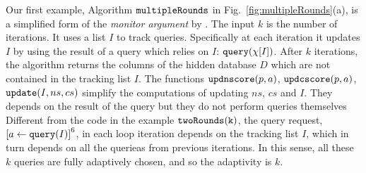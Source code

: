 %
Our first example, Algorithm $\mathtt{multipleRounds}$ in Fig.~\ref{fig:multipleRounds}(a), is a simplified form of the \emph{monitor argument} by \citet{RogersRSSTW20}.
The input $k$ is the number of iterations.
It uses a list $I$ to track queries. Specifically at each iteration it updates $I$ by using the result of a query which relies on $I$:  ${\tt query}(\chi[I])$.
After $k$ iterations, the algorithm returns the columns of the hidden database $D$ which are not contained in the  tracking list $I$.
The functions $\mathtt{updnscore}(p,a)$,
$\mathtt{updcscore}(p,a)$, $\mathtt{update}(I,ns,cs)$ simplify the computations of updating $ns$, $cs$ and $I$. They depends on the result of the query but they do not perform queries themselves%
%
%
Different from the code in the example $\mathtt{twoRounds(k)}$,
the query request, $\clabel{\assign{a}{\query(I)}}^6$, in each loop iteration
depends on the tracking list $I$, which in turn depends on  all the querieas from previous iterations. 
In this sense, all these $k$ queries are fully adaptively chosen, and so the adaptivity is $k$.
